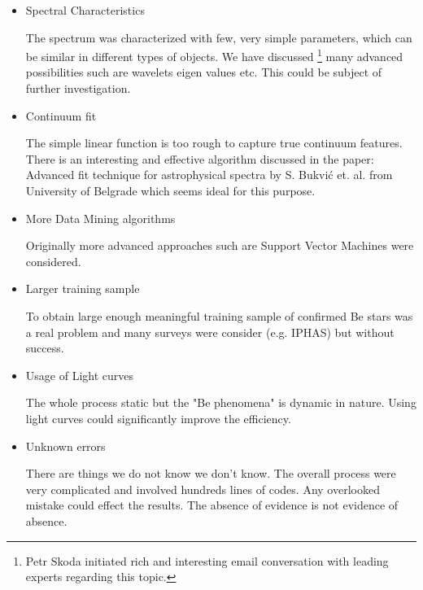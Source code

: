 \begin{itemize}
\item Spectral Characteristics 

  The spectrum was characterized with few, very simple parameters,
  which can be similar in different types of objects. We have
  discussed \footnote{Petr Skoda initiated rich and interesting email
    conversation with leading experts regarding this topic.} many
  advanced possibilities such are wavelets eigen values etc. This
  could be subject of further investigation.
\item Continuum fit

  The simple linear function is too rough to capture true continuum
  features. There is an interesting and effective algorithm discussed
  in the paper: Advanced fit technique for astrophysical spectra by
  S. Bukvi{\'c} et. al. from University of Belgrade
  \citep{bukvic2008advanced} which seems ideal for this purpose.

\item More Data Mining algorithms

Originally more advanced approaches such are Support Vector Machines
were considered.
\item Larger training sample

  To obtain large enough meaningful training sample of confirmed Be
  stars was a real problem and  many surveys were consider
  (e.g. IPHAS)  but without success.

\item Usage of Light curves 

  The whole process static but the "Be phenomena" is dynamic in
  nature. Using light curves could significantly improve the
  efficiency.
\item Unknown errors 

  There are things we do not know we don't know. The overall process
  were very complicated and involved hundreds lines of codes. Any
  overlooked mistake could effect the results. The absence of evidence
  is not evidence of absence.
\end{itemize}





